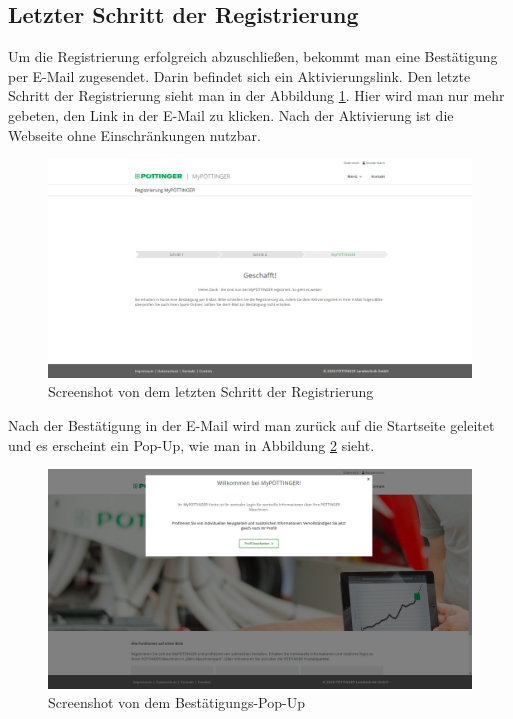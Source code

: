 \subsection{Letzter Schritt der Registrierung}
Um die Registrierung erfolgreich abzuschließen, bekommt man eine Bestätigung per E-Mail zugesendet. Darin befindet sich ein Aktivierungslink. Den letzte Schritt der Registrierung sieht man in der Abbildung \ref{fig:step3register}. Hier wird man nur mehr gebeten, den Link in der E-Mail zu klicken. Nach der Aktivierung ist die Webseite ohne Einschränkungen nutzbar.
\begin{figure}[H]
	\centerline{
		\includegraphics[width=1\textwidth, frame]{./grafiken/erm_register_final.png}
	}
	\vskip0pt
	\caption{Screenshot von dem letzten Schritt der Registrierung} \label{fig:step3register}
\end{figure}

Nach der Bestätigung in der E-Mail wird man zurück auf die Startseite geleitet und es erscheint ein Pop-Up, wie man in Abbildung \ref{fig:popup} sieht.

\begin{figure}[H]
	\centerline{
		\includegraphics[width=1\textwidth, frame]{./grafiken/erm_home_after_email.png}
	}
	\vskip0pt
	\caption{Screenshot von dem Bestätigungs-Pop-Up} \label{fig:popup}
\end{figure}

